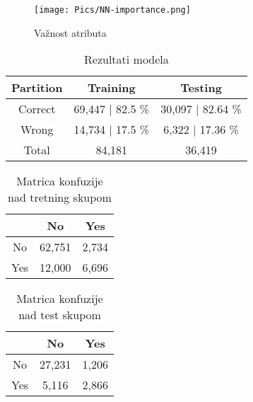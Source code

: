 \documentclass[a4paper]{article}
\begin{document}
\begin{figure}[H]
     \centering
     \texttt{[image: Pics/NN-importance.png]}
     \caption{Važnost atributa}
     \label{fig:NN-importance}
\end{figure}

\begin{table}[H]
        \begin{center}
        \caption{Rezultati modela}
        \label{tab:NN-res}
        \begin{tabular}{|c|c|c|} \hline
        \textbf{Partition} & \textbf{Training} & \textbf{Testing}\\ \hline
        Correct & 69,447 | 82.5 \% & 30,097 | 82.64 \% \\ \hline
        Wrong   & 14,734 | 17.5 \% & 6,322  | 17.36 \% \\ \hline
        Total & 84,181  & 36,419 \\ \hline
        \end{tabular}
        \end{center}
\end{table}

\begin{table}[H]
        \begin{center}
        \caption{Matrica konfuzije nad tretning skupom}
        \label{tab:NN-CM-train}
        \begin{tabular}{|c|c|c|} \hline
        \textbf{} & \textbf{No} & \textbf{Yes} \\ \hline
        No & 62,751 & 2,734  \\ \hline
        Yes & 12,000 & 6,696 \\ \hline
        \end{tabular}
        \end{center}
\end{table}
\begin{table}[H]
        \begin{center}
        \caption{Matrica konfuzije nad test skupom}
        \label{tab:NN-CM-test}
        \begin{tabular}{|c|c|c|} \hline
        \textbf{} & \textbf{No} & \textbf{Yes} \\ \hline
        No & 27,231 & 1,206  \\ \hline
        Yes &  5,116 & 2,866 \\ \hline
        \end{tabular}
        \end{center}
\end{table}
\end{document}

